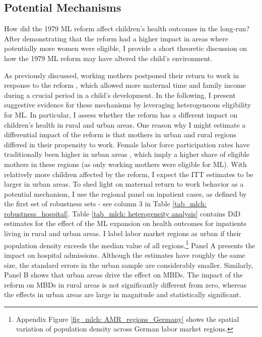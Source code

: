 \subsection{Potential Mechanisms}\label{ref_mlch: discussion_mechanisms}

How did the 1979 ML reform affect children's health outcomes in the long-run? After demonstrating that the reform had a higher impact in areas where potentially more women were eligible, I provide a short theoretic discussion on how the 1979 ML reform may have altered the child's environment.%




As previously discussed, working mothers postponed their return to work in response to the reform \citep{Dustmann2012,schonberg2014expansions}, which allowed more maternal time and family income during a crucial period in a child's development. In the following, I present suggestive evidence for these mechanisms by leveraging heterogeneous eligibility for ML. In particular, I assess whether the reform has a different impact on children's health in rural and urban areas. One reason why I might estimate a differential impact of the reform is that mothers in urban and rural regions differed in their propensity to work. Female labor force participation rates have traditionally been higher in urban areas \citep{bender1993regionale}, which imply a higher share of eligible mothers in these regions (as only working mothers were eligible for ML). With relatively more children affected by the reform, I expect the ITT estimates to be larger in urban areas. To shed light on maternal return to work behavior as a potential mechanism, I use the regional panel on inpatient cases, as defined by the first set of robustness sets - see column 3 in Table \ref{tab_mlch: robustness_hospital}. Table \ref{tab_mlch: heterogeneity analysis} contains DiD estimates for the effect of the ML expansion on health outcomes for inpatients living in rural and urban areas. I label labor market regions as urban if their population density exceeds the median value of all regions.\footnote{Appendix Figure \ref{fig_mlch: AMR_regions_Germany} shows the spatial variation of population density across German labor market regions.} Panel A presents the impact on hospital admissions. Although the estimates have roughly the same size, the standard errors in the urban sample are considerably smaller. Similarly, Panel B shows that urban areas drive the effect on MBDs. The impact of the reform on MBDs in rural areas is not significantly different from zero, whereas the effects in urban areas are large in magnitude and statistically significant.

